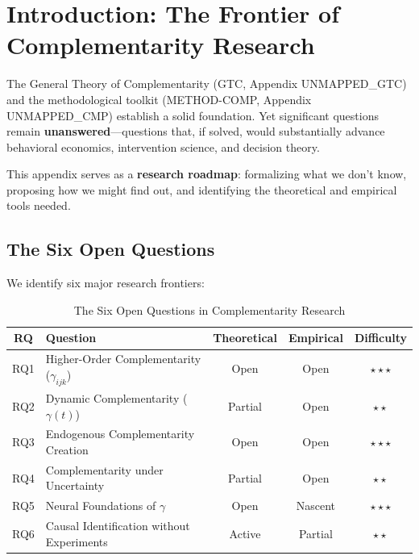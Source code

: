 \section{Introduction: The Frontier of Complementarity Research}
\label{sec:research-intro}

\begin{tcolorbox}[colback=blue!5!white,colframe=blue!75!black,title=\textbf{Fundamental Motivation}]
The General Theory of Complementarity (GTC, Appendix UNMAPPED_GTC) and the methodological toolkit (METHOD-COMP, Appendix UNMAPPED_CMP) establish a solid foundation. Yet significant questions remain \textbf{unanswered}---questions that, if solved, would substantially advance behavioral economics, intervention science, and decision theory.

This appendix serves as a \textbf{research roadmap}: formalizing what we don't know, proposing how we might find out, and identifying the theoretical and empirical tools needed.
\end{tcolorbox}

\subsection{The Six Open Questions}

We identify six major research frontiers:

\begin{table}[h]
\centering
\caption{The Six Open Questions in Complementarity Research}
\label{tab:six-questions}
\renewcommand{\arraystretch}{1.4}
\begin{tabular}{@{}clccc@{}}
\toprule
\textbf{RQ} & \textbf{Question} & \textbf{Theoretical} & \textbf{Empirical} & \textbf{Difficulty} \\
\midrule
RQ1 & Higher-Order Complementarity ($\gamma_{ijk}$) & Open & Open & $\star\star\star$ \\
RQ2 & Dynamic Complementarity ($\gamma(t)$) & Partial & Open & $\star\star$ \\
RQ3 & Endogenous Complementarity Creation & Open & Open & $\star\star\star$ \\
RQ4 & Complementarity under Uncertainty & Partial & Open & $\star\star$ \\
RQ5 & Neural Foundations of $\gamma$ & Open & Nascent & $\star\star\star$ \\
RQ6 & Causal Identification without Experiments & Active & Partial & $\star\star$ \\
\bottomrule
\end{tabular}
\end{table}

